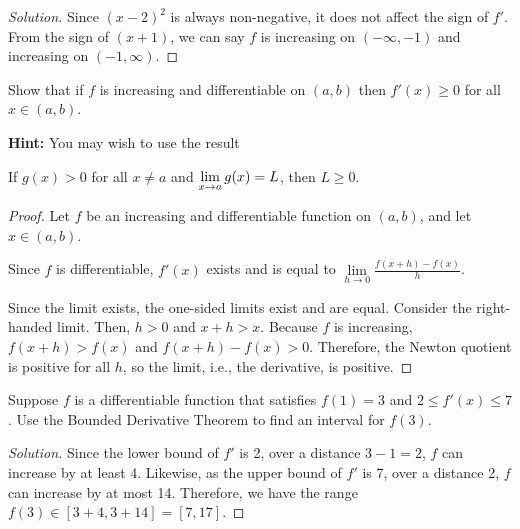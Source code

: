 \documentclass{agony}
\begin{document}
\begin{enumerate}[(a)]
\begin{proof}[Solution]
          Since $(x-2)^2$ is always non-negative, it does not affect the sign of $f'$.
          From the sign of $(x+1)$, we can say $f$ is increasing on $(-\infty,-1)$ and increasing on $(-1,\infty)$.
        \end{proof}
\end{enumerate}


\question Show that if $f$ is increasing and differentiable on $(a,b)$
then $f'(x) \geq 0$ for all $x\in(a,b)$.

\textbf{Hint:} You may wish to use the result \begin{center}
  If $g(x) > 0$ for all $x \neq a$ and $\lim\limits_{x\to a}g(x)=L$, then $L \geq 0$.
\end{center}
\begin{proof}
  Let $f$ be an increasing and differentiable function on $(a,b)$, and let $x\in(a,b)$.

  Since $f$ is differentiable, $f'(x)$ exists and is equal to
  $\lim\limits_{h\to0}\frac{f(x+h)-f(x)}{h}$.

  Since the limit exists, the one-sided limits exist and are equal.
  Consider the right-handed limit. Then, $h > 0$ and $x+h > x$.
  Because $f$ is increasing, $f(x+h) > f(x)$ and $f(x+h)-f(x) > 0$.
  Therefore, the Newton quotient is positive for all $h$,
  so the limit, i.e., the derivative, is positive.
\end{proof}


\question Suppose $f$ is a differentiable function that satisfies $f(1) = 3$ and $2 \leq f'(x) \leq 7$.
Use the Bounded Derivative Theorem to find an interval for $f(3)$.
\begin{proof}[Solution]
  Since the lower bound of $f'$ is 2, over a distance $3-1=2$, $f$ can increase by at least 4.
  Likewise, as the upper bound of $f'$ is 7, over a distance 2, $f$ can increase by at most 14.
  Therefore, we have the range $f(3)\in[3+4,3+14] = [7,17]$.
\end{proof}
\end{document}
